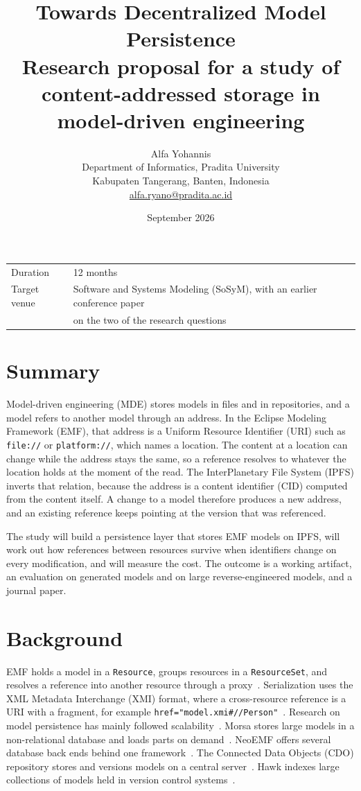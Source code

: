 \documentclass[11pt,a4paper]{article}
\title{\vspace{-12mm}\textbf{Towards Decentralized Model Persistence}\\[2mm]
\large Research proposal for a study of content-addressed storage in model-driven engineering}
\author{Alfa Yohannis\\
\small Department of Informatics, Pradita University\\
\small Kabupaten Tangerang, Banten, Indonesia\\
\small \href{mailto:alfa.ryano@pradita.ac.id}{alfa.ryano@pradita.ac.id}}
\date{September 2026}
\begin{document}
\maketitle

\begin{center}
\begin{tabular}{@{}ll@{}}
\toprule
Duration & 12 months \\
Target venue & Software and Systems Modeling (SoSyM), with an earlier conference paper \\
 & on the two of the research questions \\
\bottomrule
\end{tabular}
\end{center}

\section{Summary}

Model-driven engineering (MDE) stores models in files and in repositories, and a model refers to another model through an address. In the Eclipse Modeling Framework (EMF), that address is a Uniform Resource Identifier (URI) such as \texttt{file://} or \texttt{platform://}, which names a location. The content at a location can change while the address stays the same, so a reference resolves to whatever the location holds at the moment of the read. The InterPlanetary File System (IPFS) inverts that relation, because the address is a content identifier (CID) computed from the content itself. A change to a model therefore produces a new address, and an existing reference keeps pointing at the version that was referenced.

The study will build a persistence layer that stores EMF models on IPFS, will work out how references between resources survive when identifiers change on every modification, and will measure the cost. The outcome is a working artifact, an evaluation on generated models and on large reverse-engineered models, and a journal paper.

\section{Background}

EMF holds a model in a \texttt{Resource}, groups resources in a \texttt{ResourceSet}, and resolves a reference into another resource through a proxy~\cite{steinberg2008emf}. Serialization uses the XML Metadata Interchange (XMI) format, where a cross-resource reference is a URI with a fragment, for example \texttt{href="model.xmi\#//Person"}~\cite{omg2015xmi}. Research on model persistence has mainly followed scalability~\cite{kolovos2013roadmap}. Morsa stores large models in a non-relational database and loads parts on demand~\cite{pagan2015repository}. NeoEMF offers several database back ends behind one framework~\cite{daniel2017neoemf}. The Connected Data Objects (CDO) repository stores and versions models on a central server~\cite{cdo}. Hawk indexes large collections of models held in version control systems~\cite{barmpis2013hawk}.
\end{document}
